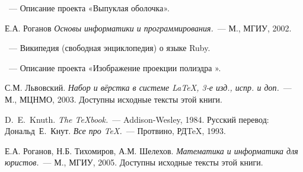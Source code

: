 \begin{thebibliography}{}

~---
Описание проекта «Выпуклая оболочка».

Е.А. Роганов
{\em Основы информатики и программирования.}~---
М., МГИУ, 2002.

~---
Википедия (свободная энциклопедия) о языке Ruby.

~---
Описание проекта «Изображение проекции полиэдра ».

С.М. Львовский.
{\em Набор и вёрстка в системе \LaTeX, 3-е изд., испр. и доп.}~---
М., МЦНМО, 2003. Доступны исходные тексты этой книги.

D.~E.~Knuth. {\em The \TeX{}book.}~---
Addison-Wesley, 1984. Русский перевод:
Дональд~Е.~Кнут.
{\em Все про \TeX.}~--- Протвино, РД\TeX, 1993.

Е.А. Роганов, Н.Б. Тихомиров, А.М. Шелехов.
{\em Математика и информатика для юристов.}~---
М., МГИУ, 2005.
Доступны исходные тексты этой книги.

\end{thebibliography}
